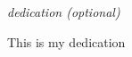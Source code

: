 \vspace*{7cm}
\begin{center}

\emph{dedication (optional)}

This is my dedication

\end{center}

\cleardoublepage